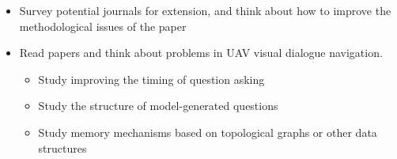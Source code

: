 \documentclass[10pt,letterpaper,oneside]{article}
\begin{document}

\begin{itemize}
  \item[\normalsize{\ding{110}}] 
    Survey potential journals for extension, and think about how to improve the methodological issues of the paper \vspace{-3 mm}\\
  \item[\normalsize{\ding{110}}] 
    Read papers and think about problems in UAV visual dialogue navigation.
    \begin{itemize}
      \item Study improving the timing of question asking
      \item Study the structure of model-generated questions
      \item Study memory mechanisms based on topological graphs or other data structures
    \end{itemize}
\end{itemize}       






\end{document}
